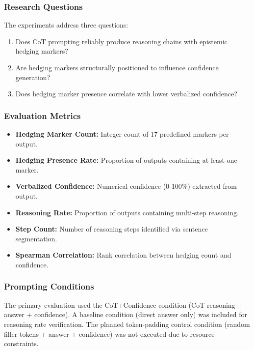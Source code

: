 
\subsubsection{Research Questions}

The experiments address three questions:

\begin{enumerate}
\item Does CoT prompting reliably produce reasoning chains with epistemic hedging markers?
\item Are hedging markers structurally positioned to influence confidence generation?
\item Does hedging marker presence correlate with lower verbalized confidence?
\end{enumerate}

\subsubsection{Evaluation Metrics}

\begin{itemize}
\item \textbf{Hedging Marker Count:} Integer count of 17 predefined markers per output.
\item \textbf{Hedging Presence Rate:} Proportion of outputs containing at least one marker.
\item \textbf{Verbalized Confidence:} Numerical confidence (0-100\%) extracted from output.
\item \textbf{Reasoning Rate:} Proportion of outputs containing multi-step reasoning.
\item \textbf{Step Count:} Number of reasoning steps identified via sentence segmentation.
\item \textbf{Spearman Correlation:} Rank correlation between hedging count and confidence.
\end{itemize}

\subsubsection{Prompting Conditions}

The primary evaluation used the CoT+Confidence condition (CoT reasoning + answer + confidence). A baseline condition (direct answer only) was included for reasoning rate verification. The planned token-padding control condition (random filler tokens + answer + confidence) was not executed due to resource constraints.
